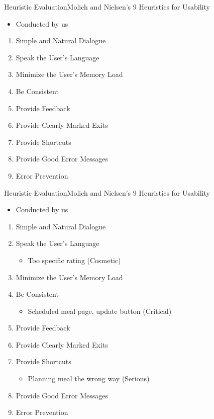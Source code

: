 \begin{frame}{Heuristic Evaluation}{Molich and Nielsen’s 9 Heuristics for Usability}
    \begin{itemize}
        \item Conducted by us
    \end{itemize}
    \begin{enumerate}
        \item Simple and Natural Dialogue
        \item Speak the User’s Language
        \item Minimize the User’s Memory Load 
        \item Be Consistent
        \item Provide Feedback 
        \item Provide Clearly Marked Exits 
        \item Provide Shortcuts 
        \item Provide Good Error Messages
        \item Error Prevention
    \end{enumerate}
\end{frame}

\begin{frame}{Heuristic Evaluation}{Molich and Nielsen’s 9 Heuristics for Usability}
    \begin{itemize}
        \item Conducted by us
    \end{itemize}
    \begin{enumerate}
        \item Simple and Natural Dialogue
        \item Speak the User’s Language
        \begin{itemize}
            \item Too specific rating (Cosmetic)
        \end{itemize}
        \item Minimize the User’s Memory Load 
        \item Be Consistent
        \begin{itemize}
            \item Scheduled meal page, update button (Critical)
        \end{itemize}
        \item Provide Feedback 
        \item Provide Clearly Marked Exits 
        \item Provide Shortcuts 
        \begin{itemize}
            \item Planning meal the wrong way (Serious)
        \end{itemize}
        \item Provide Good Error Messages
        \item Error Prevention
    \end{enumerate}
\end{frame}

